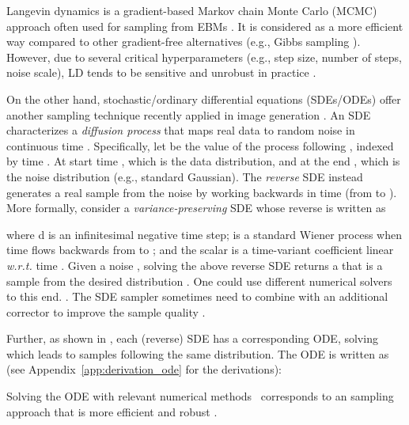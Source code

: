 \documentclass[11pt]{article}
\begin{document}
Langevin dynamics \cite[LD,][]{DBLP:conf/icml/WellingT11,DBLP:journals/corr/abs-1811-08413} is a gradient-based Markov chain Monte Carlo (MCMC) approach often used for sampling from EBMs \citep{DBLP:conf/nips/DuM19,DBLP:conf/nips/SongE19,DBLP:journals/corr/abs-2004-06030,QinCOLD}. It is considered as a more efficient way compared to other gradient-free alternatives (e.g., Gibbs sampling \citep{bishop2006pattern}). However, due to several critical hyperparameters (e.g., step size, number of steps, noise scale), LD tends to be sensitive and unrobust in practice \citep{nie2021controllable,DBLP:journals/corr/abs-1903-08689,DBLP:conf/iclr/GrathwohlWJD0S20}. 

On the other hand, stochastic/ordinary differential equations (SDEs/ODEs) \cite{anderson1982reverse} offer another sampling technique recently applied in image generation \citep{DBLP:conf/iclr/0011SKKEP21,nie2021controllable}. An SDE characterizes a \emph{diffusion process} that maps real data to random noise in continuous time . Specifically, let  be the value of the process following , indexed by time . At start time ,  which is the data distribution, and at the end ,  which is the noise distribution (e.g., standard Gaussian). The \emph{reverse} SDE instead generates a real sample from the noise by working backwards in time (from  to ). More formally, consider a {\it variance-preserving} SDE \citep{DBLP:conf/iclr/0011SKKEP21} whose reverse is written as

where d is an infinitesimal negative time step;  is a standard Wiener process when time flows backwards from  to ; and the scalar  is a time-variant coefficient linear \emph{w.r.t.} time . Given a noise , solving the above reverse SDE returns a  that is a sample from the desired distribution . One could use different numerical solvers to this end.
\cite{burrage2000numerical, higham2001algorithmic,rossler2009second}. 
The SDE sampler sometimes need to combine with an additional corrector to improve the sample quality \citep{DBLP:conf/iclr/0011SKKEP21}.

Further, as shown in \citep{DBLP:conf/iclr/0011SKKEP21,DBLP:journals/entropy/MaoutsaRO20}, each (reverse) SDE has a corresponding ODE, solving which leads to samples following the same distribution. The ODE is written as (see Appendix~\ref{app:derivation_ode} for the derivations):

Solving the ODE with relevant numerical methods~\cite{euler1824institutionum,calvo1990fifth,engstler1997mur8} corresponds to an sampling approach that is more efficient and robust \citep{DBLP:conf/iclr/0011SKKEP21,nie2021controllable}.
\end{document}
